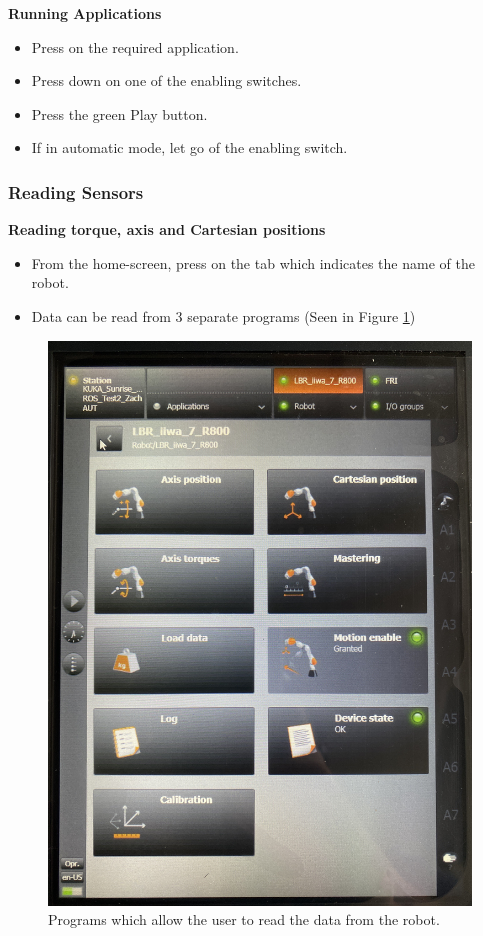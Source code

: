 \documentclass[12pt, letterpaper]{article}
\begin{document}
\textbf{Running Applications}

\begin{itemize}
    \item Press on the required application.
    \item Press down on one of the enabling switches.
    \item Press the green Play button.
    \item If in automatic mode, let go of the enabling switch. 
\end{itemize}


\subsubsection{Reading Sensors}

\textbf{Reading torque, axis and Cartesian positions}

\begin{itemize}
    \item From the home-screen, press on the tab which indicates the name of the robot.
    \item Data can be read from 3 separate programs (Seen in Figure \ref{fig:SensorReading})
\end{itemize}


\begin{figure}[H]
    \centering
    \includegraphics[scale=0.08]{Images/SmartPAD Readings.jpg}
    \caption{Programs which allow the user to read the data from the robot.}
    \label{fig:SensorReading}
\end{figure}
\end{document}
